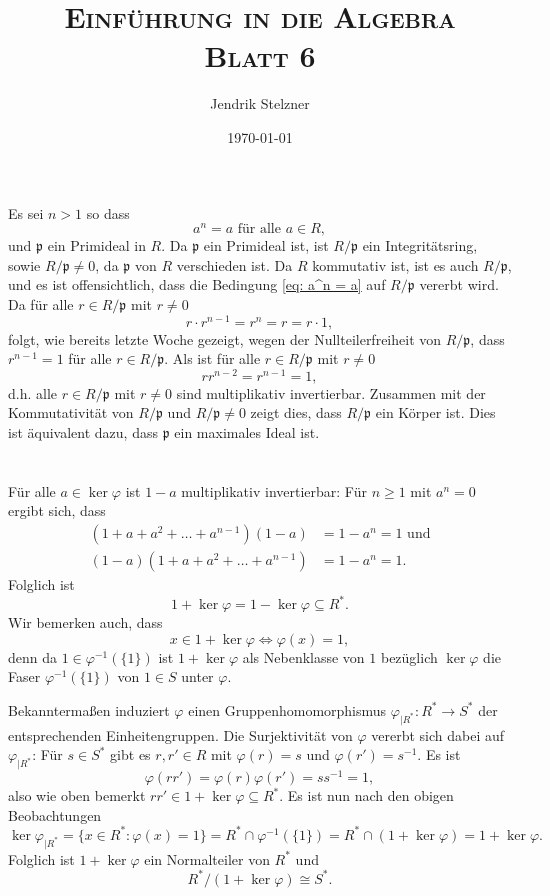 \documentclass[a4paper,10pt]{article}
\title{\textsc{Einführung in die Algebra \\ \Large Blatt 6}}
\author{Jendrik Stelzner}
\date{\today}
\theoremstyle{definition}
\newcommand{\mf}[1]{\mathfrak{#1}}
\begin{document}
\maketitle





\section{}
Es sei $n > 1$ so dass
\begin{equation}\label{eq: a^n = a}
 a^n = a \text{ für alle } a \in R,
\end{equation}
und $\mf{p}$ ein Primideal in $R$. Da $\mf{p}$ ein Primideal ist, ist $R/\mf{p}$ ein Integritätsring, sowie $R/\mf{p} \neq 0$, da $\mf{p}$ von $R$ verschieden ist. Da $R$ kommutativ ist, ist es auch $R/\mf{p}$, und es ist offensichtlich, dass die Bedingung \eqref{eq: a^n = a} auf $R/\mf{p}$ vererbt wird. Da für alle $r \in R/\mf{p}$ mit $r \neq 0$
\[
 r \cdot r^{n-1} = r^n = r = r \cdot 1,
\]
folgt, wie bereits letzte Woche gezeigt, wegen der Nullteilerfreiheit von $R/\mf{p}$, dass $r^{n-1} = 1$ für alle $r \in R/\mf{p}$. Als ist für alle $r \in R/\mf{p}$ mit $r \neq 0$
\[
 r r^{n-2} = r^{n-1} = 1,
\]
d.h. alle $r \in R/\mf{p}$ mit $r \neq 0$ sind multiplikativ invertierbar. Zusammen mit der Kommutativität von $R/\mf{p}$ und $R/\mf{p} \neq 0$ zeigt dies, dass $R/\mf{p}$ ein Körper ist. Dies ist äquivalent dazu, dass $\mf{p}$ ein maximales Ideal ist.

\section{}
Für alle $a \in \ker \varphi$ ist $1-a$ multiplikativ invertierbar: Für $n \geq 1$ mit $a^n = 0$ ergibt sich, dass
\begin{align*}
 (1+a+a^2+\ldots+a^{n-1})(1-a) &= 1-a^n = 1 \text{ und} \\
 (1-a)(1+a+a^2+\ldots+a^{n-1}) &= 1-a^n = 1.
\end{align*}
Folglich ist
\[
 1 + \ker \varphi = 1 - \ker \varphi \subseteq R^*.
\]
Wir bemerken auch, dass
\[
 x \in 1 + \ker \varphi \Leftrightarrow \varphi(x) = 1,
\]
denn da $1 \in \varphi^{-1}(\{1\})$ ist $1 + \ker \varphi$ als Nebenklasse von $1$ bezüglich $\ker \varphi$ die Faser $\varphi^{-1}(\{1\})$ von $1 \in S$ unter $\varphi$.

Bekanntermaßen induziert $\varphi$ einen Gruppenhomomorphismus $\varphi_{|R^*} : R^* \rightarrow S^*$ der entsprechenden Einheitengruppen. Die Surjektivität von $\varphi$ vererbt sich dabei auf $\varphi_{|R^*}$: Für $s\in S^*$ gibt es $r,r' \in R$ mit $\varphi(r) = s$ und $\varphi(r') = s^{-1}$. Es ist
\[
 \varphi(r r') = \varphi(r) \varphi(r') = s s^{-1} = 1,
\]
also wie oben bemerkt $r r' \in 1 + \ker \varphi \subseteq R^*$. Es ist nun nach den obigen Beobachtungen
\[
 \ker \varphi_{|R^*}
 = \{x \in R^* : \varphi(x) = 1\}
 = R^* \cap \varphi^{-1}(\{1\})
 = R^* \cap (1+ \ker \varphi)
 = 1 + \ker \varphi.
\]
Folglich ist $1 + \ker \varphi$ ein Normalteiler von $R^*$ und
\[
 R^* / (1+ \ker \varphi) \cong S^*.
\]
\end{document}
